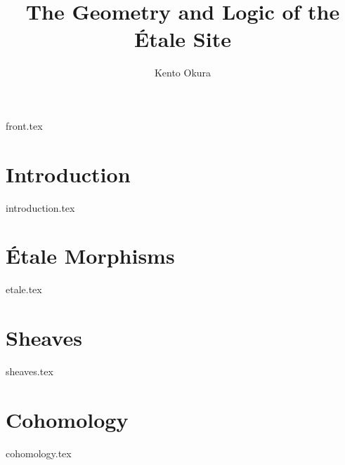 \documentclass[11pt, openany]{memoir}
\title{The Geometry and Logic of the \'Etale Site}
\author{Kento Okura}
\begin{document}


\frontmatter
{front.tex}

\mainmatter

\chapter{Introduction}
{introduction.tex}

\chapter{\'Etale Morphisms}
{etale.tex}

\chapter{Sheaves}
{sheaves.tex}

\chapter{Cohomology}
{cohomology.tex}



\end{document}

